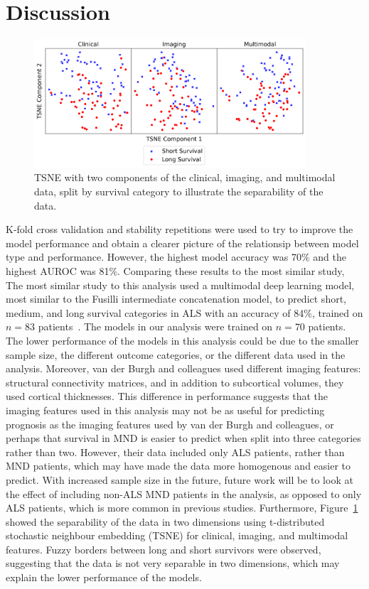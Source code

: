 \section{Discussion}

\begin{figure}
    \centering
    \includegraphics[width=0.9\textwidth]{figures/tsne_plot}
    \caption{TSNE with two components of the clinical, imaging, and multimodal data, split by survival category to illustrate the separability of the data.}
    \label{fig:tsne}
\end{figure}

K-fold cross validation and stability repetitions were used to try to improve the model performance and obtain a clearer picture of the relationsip between model type and performance.
However, the highest model accuracy was 70\% and the highest AUROC was 81\%.
Comparing these results to the most similar study,
The most similar study to this analysis used a multimodal deep learning model, most similar to the Fusilli intermediate concatenation model, to predict short, medium, and long survival categories in ALS with an accuracy of 84\%, trained on $n=83$ patients~\cite{vanderburghDeepLearningPredictions2017}.
The models in our analysis were trained on $n=70$ patients.
The lower performance of the models in this analysis could be due to the smaller sample size, the different outcome categories, or the different data used in the analysis.
Moreover, van der Burgh and colleagues used different imaging features: structural connectivity matrices, and in addition to subcortical volumes, they used cortical thicknesses.
This difference in performance suggests that the imaging features used in this analysis may not be as useful for predicting prognosis as the imaging features used by van der Burgh and colleagues, or perhaps that survival in MND is easier to predict when split into three categories rather than two.
However, their data included only ALS patients, rather than MND patients, which may have made the data more homogenous and easier to predict.
With increased sample size in the future, future work will be to look at the effect of including non-ALS MND patients in the analysis, as opposed to only ALS patients, which is more common in previous studies.
Furthermore, Figure~\ref{fig:tsne} showed the separability of the data in two dimensions using t-distributed stochastic neighbour embedding (TSNE) for clinical, imaging, and multimodal features.
Fuzzy borders between long and short survivors were observed, suggesting that the data is not very separable in two dimensions, which may explain the lower performance of the models.

